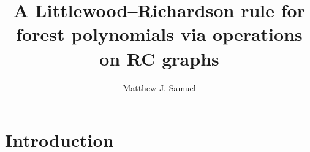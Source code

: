 \documentclass{amsart}
\title{A Littlewood--Richardson rule for forest polynomials via operations on RC graphs}
\author{Matthew J. Samuel}
\newtheorem{theorem}{Theorem}[section]
\theoremstyle{definition}
\newtheorem{definition}[lemma]{Definition}
\theoremstyle{remark}
\numberwithin{equation}{subsection}
\newcommand{\maxd}{\mathfrak{m}}
\begin{document}
\begin{abstract}
\end{abstract}

	\maketitle


\section{Introduction}





\end{document}
